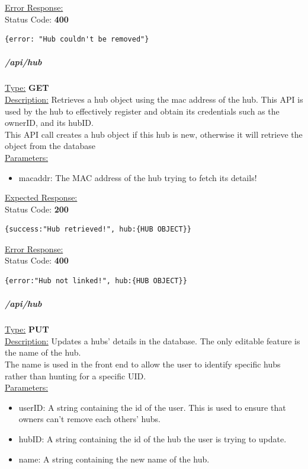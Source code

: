 \documentclass[preprint,12pt,3p]{elsarticle}
\newcommand{\forceindent}{\leavevmode{\parindent=1em\indent}}
\begin{document}
\underline{Error Response:}\\[5pt]
\forceindent Status Code: \textbf{400} \\
\begin{verbatim}
{error: "Hub couldn't be removed"}
\end{verbatim}


\subparagraph*{/api/hub}
\underline{Type:} \textbf{GET}\\

\underline{Description:} Retrieves a hub object using the mac address of the hub. This API is used by the hub to effectively register and obtain its credentials such as the ownerID, and its hubID.\\
This API call creates a hub object if this hub is new, otherwise it will retrieve the object from the database\\

\underline{Parameters:}
\begin{itemize}
\item macaddr: The MAC address of the hub trying to fetch its details!
\end{itemize}
\underline{Expected Response:}\\[5pt]
\forceindent Status Code: \textbf{200} \\
\begin{verbatim}
{success:"Hub retrieved!", hub:{HUB OBJECT}}
\end{verbatim}

\underline{Error Response:}\\[5pt]
\forceindent Status Code: \textbf{400} \\
\begin{verbatim}
{error:"Hub not linked!", hub:{HUB OBJECT}}
\end{verbatim}

\subparagraph*{/api/hub}
\underline{Type:} \textbf{PUT}\\

\underline{Description:} Updates a hubs' details in the database. The only editable feature is the name of the hub.\\
The name is used in the front end to allow the user to identify specific hubs rather than hunting for a specific UID.\\

\underline{Parameters:}
\begin{itemize}
\item userID: A string containing the id of the user. This is used to ensure that owners can't remove each others' hubs.

\item hubID: A string containing the id of the hub the user is trying to update.

\item name: A string containing the new name of the hub.
\end{itemize}
\end{document}
